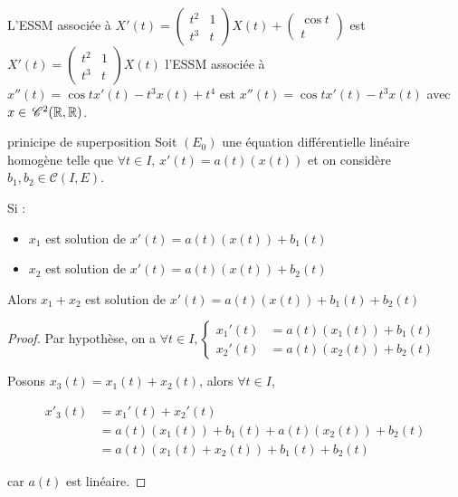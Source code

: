 \begin{exemple}
    L'ESSM associée à 
    $X'(t) = \begin{pmatrix}
        t^2 & 1 \\
        t^3 & t
     \end{pmatrix} X(t) + \begin{pmatrix}
        \cos t \\ t
    \end{pmatrix}$ est $X'(t) = \begin{pmatrix}
        t^2 & 1 \\
        t^3 & t
     \end{pmatrix} X(t)$ l'ESSM 
     associée à $x''(t) = \cos t x'(t) - t^3 x(t) + t^4$ est 
     $x''(t) = \cos t x'(t) - t^3 x(t)$ avec $x \in \,\mathscr C^{2} (\mathbb{R}, \mathbb{R})$. 
\end{exemple}

\begin{proposition}{prinicipe de superposition}{}
    Soit $(E_0)$ une équation différentielle linéaire homogène telle que 
    $\forall t \in I$, $x'(t) = a(t)(x(t))$ et on considère 
    $b_1, b_2 \in \mathscr C(I, E)$. 

    Si : 
    \begin{itemize}
        \item $x_1$ est solution de $x'(t) = a(t)(x(t)) + b_1(t)$
        \item $x_2$ est solution de $x'(t) = a(t)(x(t)) + b_2(t)$
    \end{itemize}
    Alors $x_1 + x_2$ est solution de $x'(t) = a(t)(x(t)) + b_1(t) + b_2(t)$
\end{proposition}

\begin{proof}
    Par hypothèse, on a 
    $\forall t \in I, 
\begin{cases}
    x_1'(t) & = a(t)(x_1(t)) + b_1(t) \\
    x_2'(t) & = a(t)(x_2(t)) + b_2(t)
\end{cases}$

    Posons $x_3(t) = x_1(t) + x_2(t)$, alors $\forall t \in I$, 

    \begin{align}
        x'_3(t) & = x_1'(t) + x_2'(t) \\
        & = a(t)(x_1(t)) + b_1(t) + a(t)(x_2(t)) + b_2(t) \\
        & = a(t)(x_1(t) + x_2(t)) + b_1(t) + b_2(t) 
    \end{align}

    car $a(t)$ est linéaire.
\end{proof}

